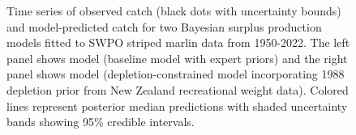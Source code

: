 \documentclass[
  11pt,
]{SCreport}
\begin{document}
\begin{figure}[H]


\caption{\label{fig-pred-catch}Time series of observed catch (black dots
with uncertainty bounds) and model-predicted catch for two Bayesian
surplus production models fitted to SWPO striped marlin data from
1950-2022. The left panel shows model 
(baseline model with expert priors) and the right panel shows model
 (depletion-constrained model
incorporating 1988 depletion prior from New Zealand recreational weight
data). Colored lines represent posterior median predictions with shaded
uncertainty bands showing 95\% credible intervals.}

\end{figure}%

\newpage
\end{document}
